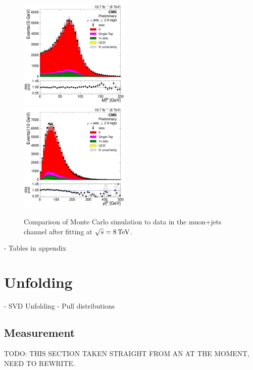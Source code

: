 \begin{figure}[hbtp]
     \includegraphics[width=0.48\textwidth]{Chapters/04_Analysis/04b_XSections/images/control_plots/after_fit/8TeV/MuPlusJets_patType1CorrectedPFMet_MT_2orMoreBtags_with_ratio.pdf}\\     
	 \includegraphics[width=0.48\textwidth]{Chapters/04_Analysis/04b_XSections/images/control_plots/after_fit/8TeV/MuPlusJets_patType1CorrectedPFMet_WPT_2orMoreBtags_with_ratio.pdf}\hfill
	 \caption{Comparison of Monte Carlo simulation to data in the muon+jets channel after fitting at
	 $\sqrt{s}=8\,\text{Te\hspace{-.08em}V}$.}
     \label{fig:data_mc_comparison_after_fit_8TeV_muon}
\end{figure}

- Tables in appendix
\FloatBarrier


\section{Unfolding}
\label{ss:unfolding}
		- SVD Unfolding
		- Pull distributions

\subsection{Measurement}
\label{ss:measurement}
TODO: THIS SECTION TAKEN STRAIGHT FROM AN AT THE MOMENT, NEED TO REWRITE.

